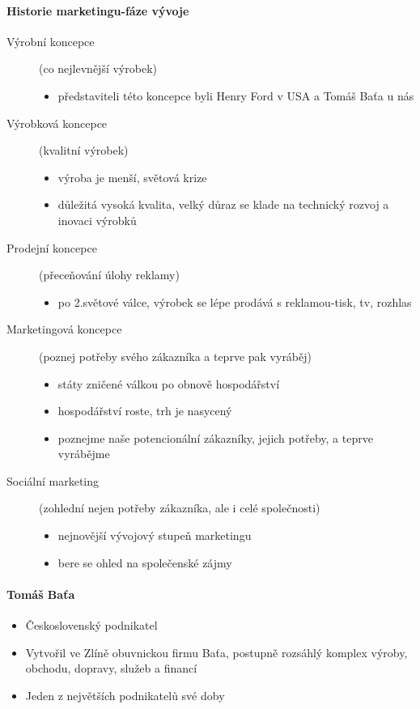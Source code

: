 \documentclass[11pt,a4paper,twoside]{book}
\begin{document}
	\paragraph*{Historie marketingu-fáze vývoje}
	\begin{description}
		\item[Výrobní koncepce] (co nejlevnější výrobek)
			\begin{itemize}
				\item představiteli této koncepce byli Henry Ford v USA a Tomáš Baťa u nás
			\end{itemize}
		\item[Výrobková koncepce] (kvalitní výrobek)
			\begin{itemize}
				\item výroba je menší, světová krize
				\item důležitá vysoká kvalita, velký důraz se klade na technický rozvoj a inovaci výrobků
			\end{itemize}
		\item[Prodejní koncepce] (přeceňování úlohy reklamy)
			\begin{itemize}
				\item po 2.světové válce, výrobek se lépe prodává s reklamou-tisk, tv, rozhlas
			\end{itemize}
		\item[Marketingová koncepce] (poznej potřeby svého zákazníka a teprve pak vyráběj)
			\begin{itemize}
				\item státy zničené válkou po obnově hospodářství
				\item hospodářství roste, trh je nasycený
				\item poznejme naše potencionální zákazníky, jejich potřeby, a teprve vyrábějme
			\end{itemize}
		\item[Sociální marketing] (zohlední nejen potřeby zákazníka, ale i celé společnosti)
			\begin{itemize}
				\item nejnovější vývojový stupeň marketingu
				\item bere se ohled na společenské zájmy
			\end{itemize}
	\end{description}

	\paragraph*{Tomáš Baťa}
		\begin{itemize}
			\item {Československý podnikatel}
			\item Vytvořil ve Zlíně obuvnickou firmu Baťa, postupně rozsáhlý komplex výroby, obchodu, dopravy, služeb a financí
			\item Jeden z největších podnikatelů své doby
		\end{itemize}
\end{document}
